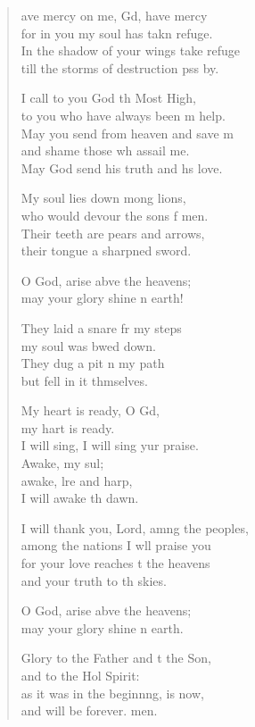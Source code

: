 \begin{verse}
  \begin{patverse}
    ave mercy on me, Gd, have mercy\Med\\
for in you my soul has takn refuge.\\
In the shadow of your wings  take refuge\Med\\
till the storms of destruction pss by.

I call to you God th Most High,\Med\\
to you who have always been m help.\\
May you send from heaven and save m\Flex\\
and shame those wh assail me.\Med\\
May God send his truth and h\pointup{\i}s love.

My soul lies down mong lions,\Med\\
who would devour the sons f men.\\
Their teeth are pears and arrows,\Med\\
their tongue a sharpned sword.

O God, arise abve the heavens;\Med\\
may your glory shine n earth!

They laid a snare fr my steps\Med\\
my soul was bwed down.\\
They dug a pit \pointup{\i}n my path\Med\\
but fell in it thmselves.

My heart is ready, O Gd,\Flex\\
my hart is ready.\Med\\
I will sing, I will sing yur praise.\\
Awake, my sul;\Flex\\
awake, lre and harp,\Med\\
I will awake th dawn.

I will thank you, Lord, amng the peoples,\Med\\
among the nations I w\pointup{\i}ll praise you\\
for your love reaches t the heavens\Med\\
and your truth to th skies.

O God, arise abve the heavens;\Med\\
may your glory shine n earth.

Glory to the Father and t the Son,\Med\\
and to the Hol Spirit:\\
as it was in the beginn\pointup{\i}ng, is now,\Med\\
and will be forever. men. 
  \end{patverse}
\end{verse}
